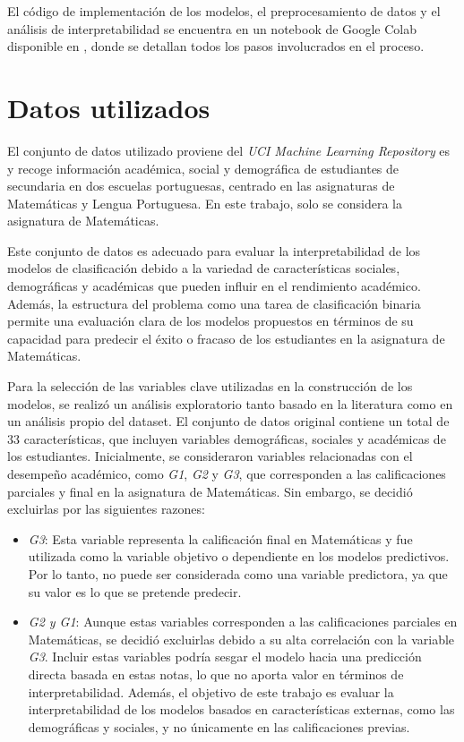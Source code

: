 El código de implementación de los modelos, el preprocesamiento de datos y el análisis de interpretabilidad se encuentra en un notebook de Google Colab disponible en \cite{vargas2024interpretability}, donde se detallan todos los pasos involucrados en el proceso.


\section{Datos utilizados}

El conjunto de datos utilizado proviene del \textit{UCI Machine Learning Repository} es \cite{cortez2014student} y recoge información académica, social y demográfica de estudiantes de secundaria en dos escuelas portuguesas, centrado en las asignaturas de Matemáticas y Lengua Portuguesa. En este trabajo, solo se considera la asignatura de Matemáticas.

Este conjunto de datos es adecuado para evaluar la interpretabilidad de los modelos de clasificación debido a la variedad de características sociales, demográficas y académicas que pueden influir en el rendimiento académico. Además, la estructura del problema como una tarea de clasificación binaria permite una evaluación clara de los modelos propuestos en términos de su capacidad para predecir el éxito o fracaso de los estudiantes en la asignatura de Matemáticas.

Para la selección de las variables clave utilizadas en la construcción de los modelos, se realizó un análisis exploratorio tanto basado en la literatura \cite{cortez-2014} como en un análisis propio del dataset. El conjunto de datos original contiene un total de 33 características, que incluyen variables demográficas, sociales y académicas de los estudiantes. Inicialmente, se consideraron variables relacionadas con el desempeño académico, como \textit{G1}, \textit{G2} y \textit{G3}, que corresponden a las calificaciones parciales y final en la asignatura de Matemáticas. Sin embargo, se decidió excluirlas por las siguientes razones:

\begin{itemize}
    \item \textit{G3}: Esta variable representa la calificación final en Matemáticas y fue utilizada como la variable objetivo o dependiente en los modelos predictivos. Por lo tanto, no puede ser considerada como una variable predictora, ya que su valor es lo que se pretende predecir.
    
    \item \textit{G2 y G1}: Aunque estas variables corresponden a las calificaciones parciales en Matemáticas, se decidió excluirlas debido a su alta correlación con la variable \textit{G3}. Incluir estas variables podría sesgar el modelo hacia una predicción directa basada en estas notas, lo que no aporta valor en términos de interpretabilidad. Además, el objetivo de este trabajo es evaluar la interpretabilidad de los modelos basados en características externas, como las demográficas y sociales, y no únicamente en las calificaciones previas.
\end{itemize}

